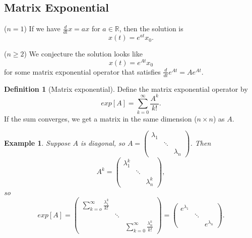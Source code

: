 \documentclass{tufte-handout}
\newcommand*\R{\mathbb{R}}
\newtheorem{ex}[thm]{Example}
\theoremstyle{definition}
\newtheorem{defn}[thm]{Definition}
\begin{document}
\subsection{Matrix Exponential}
($n=1$) If we have $\frac{d}{dt} x = ax$ for $a \in \R$, then the solution is \[
	x(t) = e^{at}x_0
.\] 

($n \ge 2$) We conjecture the solution looks like \[
	x(t) = e^{At} x_0
\] for some matrix exponential operator that satisfies $\frac{d}{dt} e^{At} = A e^{At}$.

\begin{defn}[Matrix exponential]
	Define the matrix exponential operator by \[
		exp[A] = \sum\limits_{k=0}^{\infty} \frac{A^k}{k!}
	.\] If the sum converges, we get a matrix in the same dimension ($n \times n$) as $A$.
\end{defn}

\begin{ex}
	Suppose $A$ is diagonal, so $A = \begin{pmatrix}
		\lambda_1 & & \\
				  & \ddots & \\
				  & & \lambda_n
	\end{pmatrix}$. Then \[
		A^k = \begin{pmatrix}
			\lambda_1^k & & \\
						& \ddots & \\
						& & \lambda_n^{k}
		\end{pmatrix} 
	,\] so \[
	exp[A] = \begin{pmatrix}
		\sum\limits_{k=o}^{\infty} \frac{\lambda_1^{k}}{k!} & & \\
															& \ddots & \\
															& & \sum\limits_{k=0}^{\infty} \frac{\lambda_n^k}{k!}
	\end{pmatrix} = \begin{pmatrix}
		e^{\lambda_1} & & \\
					  & \ddots & \\
					  & &e^{\lambda_n}
	\end{pmatrix} 
	.\] 
\end{ex}
\end{document}
